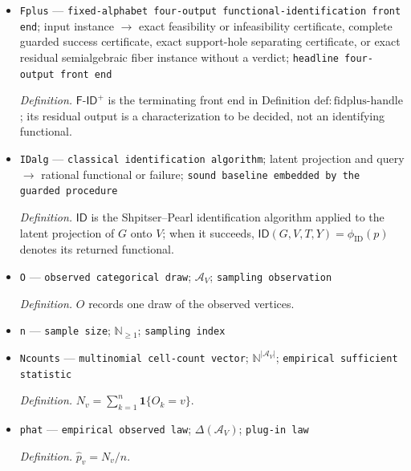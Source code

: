 \documentclass{article}
\begin{document}
\begin{itemize}
  \par\smallskip\noindent\emph{Definition.} \(\mathcal S_{\mathrm{sep}}\) is the set of pairs \(\theta^{(0)},\theta^{(1)}\) satisfying the two copies of the fixed qualitative model constraints, \(p_{M_0}=p_{M_1}\), and \(q_{M_0}\ne q_{M_1}\). For graph, alphabet, functional, and positivity input stated with rational coefficients, this set is defined over \(\mathbb Q\).
  \item \texttt{Fplus} --- \texttt{fixed-\allowbreak{}alphabet four-\allowbreak{}output functional-\allowbreak{}identification front end}; input instance \(\to\) exact feasibility or infeasibility certificate, complete guarded success certificate, exact support-hole separating certificate, or exact residual semialgebraic fiber instance without a verdict; \texttt{headline four-\allowbreak{}output front end}
  \par\smallskip\noindent\emph{Definition.} \(\mathsf{F\text{-}ID}^{+}\) is the terminating front end in Definition \(\mathrm{def:fidplus\text{-}handle}\); its residual output is a characterization to be decided, not an identifying functional.
  \item \texttt{IDalg} --- \texttt{classical identification algorithm}; latent projection and query \(\to\) rational functional or failure; \texttt{sound baseline embedded by the guarded procedure}
  \par\smallskip\noindent\emph{Definition.} \(\mathsf{ID}\) is the Shpitser--Pearl identification algorithm applied to the latent projection of \(G\) onto \(V\); when it succeeds, \(\mathsf{ID}(G,V,T,Y)=\phi_{\mathrm{ID}}(p)\) denotes its returned functional.
  \item \texttt{O} --- \texttt{observed categorical draw}; \(\mathcal A_V\); \texttt{sampling observation}
  \par\smallskip\noindent\emph{Definition.} \(O\) records one draw of the observed vertices.
  \item \texttt{n} --- \texttt{sample size}; \(\mathbb N_{\ge 1}\); \texttt{sampling index}
  \item \texttt{Ncounts} --- \texttt{multinomial cell-\allowbreak{}count vector}; \(\mathbb N^{|\mathcal A_V|}\); \texttt{empirical sufficient statistic}
  \par\smallskip\noindent\emph{Definition.} \(N_v=\sum_{k=1}^n\mathbf 1\{O_k=v\}\).
  \item \texttt{phat} --- \texttt{empirical observed law}; \(\Delta(\mathcal A_V)\); \texttt{plug-\allowbreak{}in law}
  \par\smallskip\noindent\emph{Definition.} \(\widehat p_v=N_v/n\).

\end{itemize}
\end{document}
